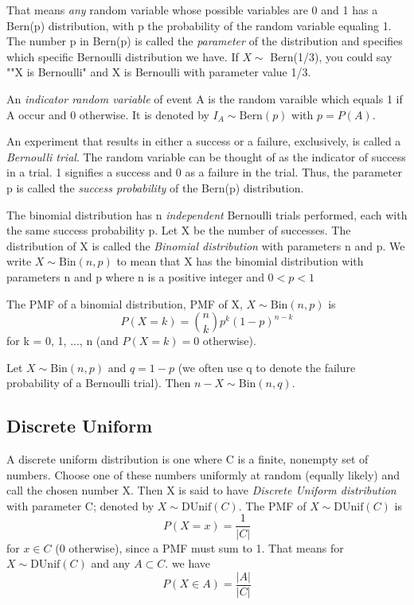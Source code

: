 \documentclass[12pt, letterpaper]{article}
\begin{document}
That means \textit{any} random variable whose possible variables are 0 and 1 has a Bern(p) distribution, with p the probability of the random variable equaling 1. The number p in Bern(p) is called the \textit{parameter} of the distribution and specifies which specific Bernoulli distribution we have. If \(X \sim \) Bern(1/3), you could say ""X is Bernoulli" and X is Bernoulli with parameter value 1/3.

An \textit{indicator random variable} of event A is the random varaible which equals 1 if A occur and 0 otherwise. It is denoted by \(I_A \sim \text{Bern}(p)\) with \(p = P(A)\).

An experiment that results in either a success or a failure, exclusively, is called a \textit{Bernoulli trial}. The random variable can be thought of as the indicator of success in a trial. 1 signifies a success and 0 as a failure in the trial. Thus, the parameter p is called the \textit{success probability} of the Bern(p) distribution.

The binomial distribution has n \textit{independent} Bernoulli trials performed, each with the same success probability p. Let X be the number of successes. The distribution of X is called the \textit{Binomial distribution} with parameters n and p. We write \(X \sim \text{Bin}(n, p)\) to mean that X has the binomial distribution with parameters n and p where n is a positive integer and \(0 < p < 1\)

The PMF of a binomial distribution, PMF of X, \(X \sim \text{Bin}(n, p)\) is 
\[ 
P(X = k) = \binom{n}{k} p^k(1 - p)^{n - k}
\] 
for k = 0, 1, ..., n (and \(P(X = k ) = 0\) otherwise).

Let \(X \sim \text{Bin}(n, p)\) and \(q = 1 - p\) (we often use q to denote the failure probability of a Bernoulli trial). Then \(n - X \sim \text{Bin}(n, q)\).

\subsection{Discrete Uniform}

A discrete uniform distribution is one where C is a finite, nonempty set of numbers. Choose one of these numbers uniformly at random (equally likely) and call the chosen number X. Then X is said to have \textit{Discrete Uniform distribution} with parameter C; denoted by \(X \sim \text{DUnif}(C)\). The PMF of \(X \sim \text{DUnif}(C)\) is 
\[
P(X = x) = \frac{1}{|C|}    
\]
for \(x \in C\) (0 otherwise), since a PMF must sum to 1. That means for \(X \sim \text{DUnif}(C)\) and any \(A \subset C\). we have 
\[
P(X \in A) = \frac{|A|}{|C|}    
\]
\end{document}
